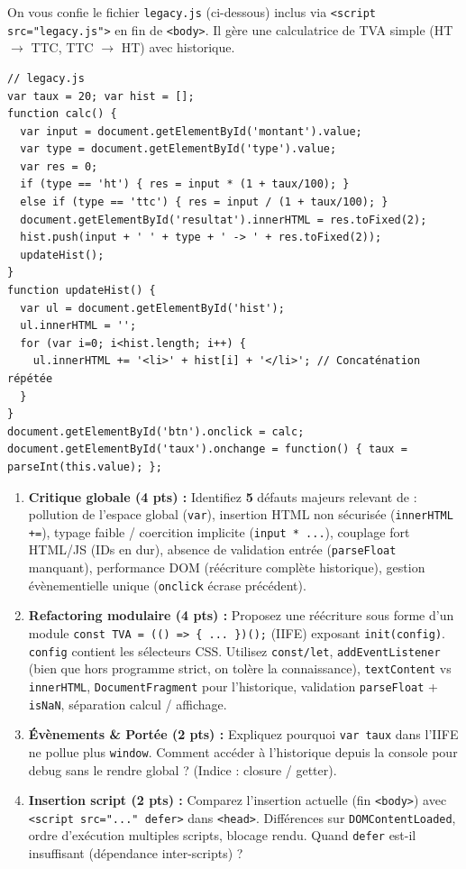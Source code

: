 \documentclass[11pt]{article}
\begin{document}
\begin{exercice}
On vous confie le fichier \texttt{legacy.js} (ci-dessous) inclus via \texttt{<script src="legacy.js">} en fin de \texttt{<body>}. Il gère une calculatrice de TVA simple (HT $\to$ TTC, TTC $\to$ HT) avec historique.
\begin{verbatim}
// legacy.js
var taux = 20; var hist = [];
function calc() {
  var input = document.getElementById('montant').value;
  var type = document.getElementById('type').value;
  var res = 0;
  if (type == 'ht') { res = input * (1 + taux/100); }
  else if (type == 'ttc') { res = input / (1 + taux/100); }
  document.getElementById('resultat').innerHTML = res.toFixed(2);
  hist.push(input + ' ' + type + ' -> ' + res.toFixed(2));
  updateHist();
}
function updateHist() {
  var ul = document.getElementById('hist');
  ul.innerHTML = '';
  for (var i=0; i<hist.length; i++) {
    ul.innerHTML += '<li>' + hist[i] + '</li>'; // Concaténation répétée
  }
}
document.getElementById('btn').onclick = calc;
document.getElementById('taux').onchange = function() { taux = parseInt(this.value); };
\end{verbatim}
\begin{enumerate}
    \item \textbf{Critique globale (4 pts) :} Identifiez \textbf{5} défauts majeurs relevant de : pollution de l'espace global (\texttt{var}), insertion HTML non sécurisée (\texttt{innerHTML +=}), typage faible / coercition implicite (\texttt{input * ...}), couplage fort HTML/JS (IDs en dur), absence de validation entrée (\texttt{parseFloat} manquant), performance DOM (réécriture complète historique), gestion évènementielle unique (\texttt{onclick} écrase précédent).
    \item \textbf{Refactoring modulaire (4 pts) :} Proposez une réécriture sous forme d'un module \texttt{const TVA = (() => \{ ... \})();} (IIFE) exposant \texttt{init(config)}. \texttt{config} contient les sélecteurs CSS. Utilisez \texttt{const/let}, \texttt{addEventListener} (bien que hors programme strict, on tolère la connaissance), \texttt{textContent} vs \texttt{innerHTML}, \texttt{DocumentFragment} pour l'historique, validation \texttt{parseFloat} + \texttt{isNaN}, séparation calcul / affichage.
    \item \textbf{Évènements \& Portée (2 pts) :} Expliquez pourquoi \texttt{var taux} dans l'IIFE ne pollue plus \texttt{window}. Comment accéder à l'historique depuis la console pour debug sans le rendre global ? (Indice : closure / getter).
    \item \textbf{Insertion script (2 pts) :} Comparez l'insertion actuelle (fin \texttt{<body>}) avec \texttt{<script src="..." defer>} dans \texttt{<head>}. Différences sur \texttt{DOMContentLoaded}, ordre d'exécution multiples scripts, blocage rendu. Quand \texttt{defer} est-il insuffisant (dépendance inter-scripts) ?
\end{enumerate}
\end{exercice}
\end{document}
